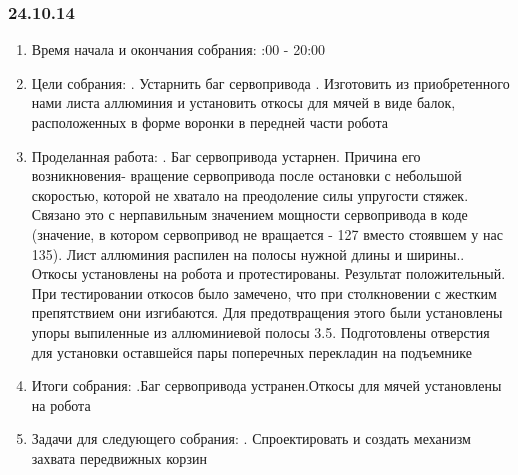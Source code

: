 \documentclass[12pt]{article}
\begin{document}
       \subsubsection{24.10.14}
      \begin{enumerate}
 	   \item Время начала и окончания собрания:
 	 :00 - 20:00
 	 \item Цели собрания:
 	 . Устарнить баг сервопривода
 	 . Изготовить из приобретенного нами листа аллюминия и установить откосы для мячей в виде балок, расположенных в форме воронки в передней части робота
 	 \item Проделанная работа:
 	 . Баг сервопривода устарнен. Причина его возникновения- вращение сервопривода после остановки с небольшой скоростью, которой не хватало на преодоление силы упругости стяжек. Связано это с нерпавильным значением мощности сервопривода в коде (значение, в котором сервопривод не вращается - 127 вместо стоявшем у нас 135). Лист аллюминия распилен на полосы нужной длины и ширины.. Откосы установлены на робота и протестированы. Результат положительный. При тестировании откосов было замечено, что при столкновении с жестким препятствием они изгибаются. Для предотвращения этого были установлены упоры выпиленные из аллюминиевой полосы
 	 3.5. Подготовлены отверстия для установки оставшейся пары поперечных перекладин на подъемнике
 	 \item Итоги собрания:
 	 .Баг сервопривода устранен.Откосы для мячей установлены на робота
 	 \item Задачи для следующего собрания:
 	 . Спроектировать и создать механизм захвата передвижных корзин
 \end{enumerate}
\end{document}
